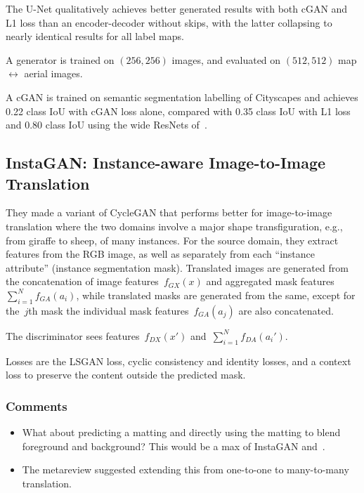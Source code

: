 \documentclass[a4paper, 12pt]{article}
\begin{document}
The U-Net qualitatively achieves better generated results with both cGAN and L1
loss than an encoder-decoder without skips, with the latter collapsing to
nearly identical results for all label maps.

A generator is trained on $(256, 256)$ images, and evaluated on $(512, 512)$
map $\leftrightarrow$ aerial images.

A cGAN is trained on semantic segmentation labelling of
Cityscapes\citet{DBLP:journals/corr/CordtsORREBFRS16} and achieves 0.22 class
IoU with cGAN loss alone, compared with 0.35 class IoU with L1 loss and 0.80
class IoU using the wide ResNets of~\citet{DBLP:journals/corr/WuSH16e}.


\subsection{InstaGAN: Instance-aware Image-to-Image
            Translation~\cite{mo2019instagan}}

They made a variant of CycleGAN that performs better for image-to-image
translation where the two domains involve a major shape transfiguration, e.g.,
from giraffe to sheep, of many instances.
For the source domain, they extract features from the RGB image, as well as
separately from each ``instance attribute'' (instance segmentation mask).
Translated images are generated from the concatenation of image
features~$f_{GX}(x)$ and aggregated mask features~$\sum_{i = 1}^N f_{GA}(a_i)$,
while translated masks are generated from the same, except for the~$j$th mask
the individual mask features~$f_{GA}(a_j)$ are also concatenated.

The discriminator sees features~$f_{DX}(x')$ and~$\sum_{i = 1}^N f_{DA}(a_i')$.

Losses are the LSGAN loss, cyclic consistency and identity losses, and a
context loss to preserve the content outside the predicted mask.

\subsubsection{Comments}

\begin{itemize}
        \item What about predicting a matting and directly using the matting to
                blend foreground and background? This would be a max of
                InstaGAN and~\cite{mejjati2018unsupervised}.

        \item The metareview suggested extending this from one-to-one to
                many-to-many translation.
\end{itemize}
\end{document}
